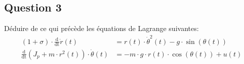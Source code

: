 \documentclass[class=article, crop=false]{standalone}
\begin{document}
\subsection*{Question 3}
\begin{exercise}
    Déduire de ce qui précède les équations de Lagrange suivantes:
    \begin{align}
        (1 + \sigma) \cdot \frac{\text{d}}{\text{dt}} \dot{r}(t) 
        &= 
        r(t) \cdot \dot{\theta}^2(t) - g \cdot \sin(\theta(t))
        \label{eq:def_Lagrange1}\\
        \frac{\text{d}}{\text{dt}} (J_p + m \cdot r^2(t)) \cdot \dot{\theta}(t)
        &= 
        -m \cdot g \cdot r(t) \cdot \cos(\theta(t)) + u(t)
        \label{eq:def_Lagrange2}
    \end{align}
\end{exercise}
\end{document}
